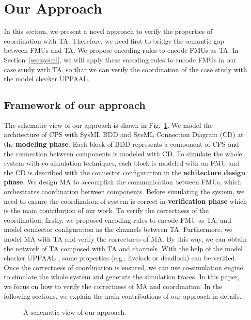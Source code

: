 \section{Our Approach}
In this section, we present a novel approach to verify the properties of coordination with TA. Therefore, we need first to bridge the semantic gap between FMUs and TA. We propose encoding rules to encode FMUs as TA. In Section~\ref{sec:sysml}, we will apply these encoding rules to encode FMUs in our case study with TA, so that we can verify the coordination of the case study with the model checker UPPAAL.
\label{sec:encoding}
\subsection{Framework of our approach}
The schematic view of our approach is shown in Fig.~\ref{paper-arc}. We model the architecture of CPS with SysML BDD and SysML Connection Diagram (CD) at the \textbf{modeling phase}. Each block of BDD represents a component of CPS and the connection between components is modeled with CD. To simulate the whole system with co-simulation techniques, each block is modeled with an FMU and the CD is described with the connector configuration in the \textbf{achitecture design phase}. We design MA to accomplish the communication between FMUs, which orchestrates coordination between components. Before simulating the system, we need to ensure the coordination of system is correct in \textbf{verification phase} which is the main contribution of our work. To verify the correctness of the coordination, firstly, we proposed encoding rules to encode FMU as TA, and model connector configuration as the channels between TA. Furthermore, we model MA with TA and verify the correctness of MA. By this way, we can obtain the network of TA composed with TA and channels. With the help of the model checker UPPAAL \cite{BehrmannDLHPYH06}, some properties (e.g., livelock or deadlock) can be verified. Once the correctness of coordination is ensured, we can use co-simulation engine to simulate the whole system and generate the simulation traces. In this paper, we focus on how to verify the correctness of MA and coordination. In the following sections, we explain the main contributions of our approach in details.
\begin{figure}[htbp]
	\caption{A schematic view of our approach.}
	\label{paper-arc}
\end{figure}

